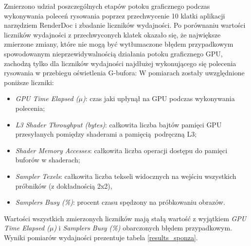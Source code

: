 Zmierzono udział poszczególnych etapów potoku graficznego podczas wykonywania poleceń rysowania poprzez przechwycenie 10 klatki aplikacji narzędziem RenderDoc i zbadanie liczników wydajności.
Po porównaniu wartości liczników wydajności z przechwyconych klatek okazało się, że największe zmierzone zmiany, które nie mogą być wytłumaczone błędem przypadkowym spowodowanym nieprzewidywalnością działania potoku graficznego GPU, zachodzą tylko dla liczników wydajności najdłużej wykonującego się polecenia rysowania w przebiegu oświetlenia G-bufora:
W pomiarach zostały uwzględnione poniższe liczniki:
\begin{itemize}
	\item \textit{GPU Time Elapsed ($\mu$)}: czas jaki upłynął na GPU podczas wykonywania polecenia;
	\item \textit{L3 Shader Throughput (bytes)}: całkowita liczba bajtów pamięci GPU przesyłanych pomiędzy shaderami a pamięcią podręczną L3;
	\item \textit{Shader Memory Accesses}: całkowita liczba operacji dostępu do pamięci buforów w shaderach;
	\item \textit{Sampler Texels}: całkowita liczba tekseli widocznych na wejściu wszystkich próbników (z dokładnością 2x2),
	\item \textit{Samplers Busy (\%)}: procent czasu spędzony na próbkowaniu obrazów.
\end{itemize}
Wartości wszystkich zmierzonych liczników mają stałą wartość z wyjątkiem \textit{GPU Time Elapsed ($\mu$)} i \textit{Samplers Busy (\%)} obarczonych błędem przypadkowym.
Wyniki pomiarów wydajności prezentuje tabela \ref{results_sponza}.

